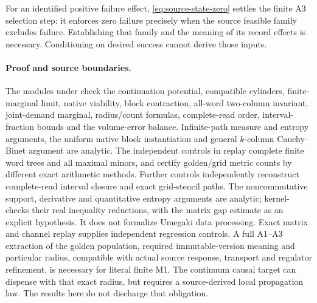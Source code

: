 For an identified positive failure effect, \eqref{eq:source-state-zero}
settles the finite A3 selection step: it enforces zero failure precisely
when the source feasible family excludes failure. Establishing
that family and the meaning of its record effects is necessary.
Conditioning on desired success cannot derive those inputs.

\paragraph{Proof and source boundaries.}
The modules under 
check the continuation potential, compatible cylinders, finite-marginal
limit, native viability, block contraction, all-word two-column invariant,
joint-demand marginal, radius/count formulas, complete-read order,
interval-fraction bounds and the volume-error balance. Infinite-path measure and
entropy arguments, the uniform native block instantiation and general
$k$-column Cauchy--Binet argument are analytic. The independent controls
in  replay complete finite word
trees and all maximal minors, and certify golden/grid metric counts by
different exact arithmetic methods. Further controls independently
reconstruct complete-read interval closure and exact grid-stencil paths.
The noncommutative support, derivative and quantitative entropy arguments
are analytic;  kernel-checks their real
inequality reductions, with the matrix gap estimate as an explicit
hypothesis. It does not formalize Umegaki data processing. Exact matrix
and channel replay supplies independent regression controls.
A full A1--A3 extraction of the golden
population, required immutable-version meaning and particular radius,
compatible with actual source response, transport and regulator refinement,
is necessary for literal finite M1. The continuum causal target can
dispense with that exact radius, but requires a source-derived local
propagation law. The results here do not discharge that obligation.
